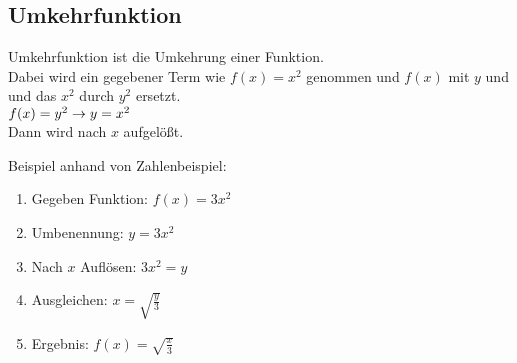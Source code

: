 \subsection{Umkehrfunktion}
Umkehrfunktion ist die Umkehrung einer Funktion. \\
Dabei wird ein gegebener Term wie $f(x) = x^2$ genommen und $f(x)$ mit $y$ und und das $x^2$ durch $y^2$ ersetzt. \\
$
f(x) = y^2 \\
\rightarrow y = x^2
$
\\
Dann wird nach $x$ aufgelößt.

Beispiel anhand von Zahlenbeispiel:
\begin{enumerate}
    \item Gegeben Funktion: $f(x) = 3x^2$
    \item Umbenennung: $y = 3x^2$
    \item Nach $x$ Auflösen: $3x^2 = y$
    \item Ausgleichen: $x = \sqrt{\frac{y}{3}}$
    \item Ergebnis: $f(x) = \sqrt{\frac{x}{3}}$
\end{enumerate}
